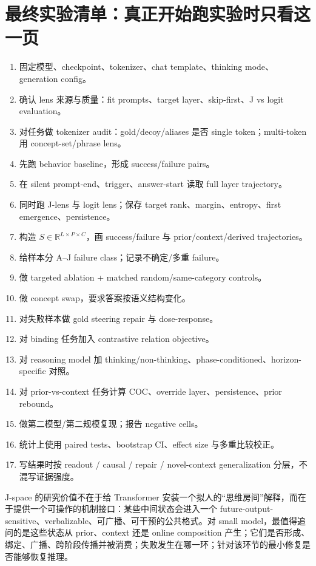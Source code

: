 \documentclass[10.5pt,a4paper]{ctexart}
\begin{document}
\section{最终实验清单：真正开始跑实验时只看这一页}
\begin{enumerate}
  \item 固定模型、checkpoint、tokenizer、chat template、thinking mode、generation config。
  \item 确认 lens 来源与质量：fit prompts、target layer、skip-first、J vs logit evaluation。
  \item 对任务做 tokenizer audit：gold/decoy/aliases 是否 single token；multi-token 用 concept-set/phrase lens。
  \item 先跑 behavior baseline，形成 success/failure pairs。
  \item 在 silent prompt-end、trigger、answer-start 读取 full layer trajectory。
  \item 同时跑 J-lens 与 logit lens；保存 target rank、margin、entropy、first emergence、persistence。
  \item 构造 $S\in\mathbb R^{L\times P\times C}$，画 success/failure 与 prior/context/derived trajectories。
  \item 给样本分 A--J failure class；记录不确定/多重 failure。
  \item 做 targeted ablation + matched random/same-category controls。
  \item 做 concept swap，要求答案按语义结构变化。
  \item 对失败样本做 gold steering repair 与 dose-response。
  \item 对 binding 任务加入 contrastive relation objective。
  \item 对 reasoning model 加 thinking/non-thinking、phase-conditioned、horizon-specific 对照。
  \item 对 prior-vs-context 任务计算 COC、override layer、persistence、prior rebound。
  \item 做第二模型/第二规模复现；报告 negative cells。
  \item 统计上使用 paired tests、bootstrap CI、effect size 与多重比较校正。
  \item 写结果时按 readout / causal / repair / novel-context generalization 分层，不混写证据强度。
\end{enumerate}

\begin{keybox}[title={\bfseries 研究主线的最终收束}]
J-space 的研究价值不在于给 Transformer 安装一个拟人的“思维房间”解释，而在于提供一个可操作的机制接口：某些中间状态会进入一个 future-output-sensitive、verbalizable、可广播、可干预的公共格式。对 small model，最值得追问的是这些状态从 prior、context 还是 online composition 产生；它们是否形成、绑定、广播、跨阶段传播并被消费；失败发生在哪一环；针对该环节的最小修复是否能够恢复推理。
\end{keybox}
\end{document}
